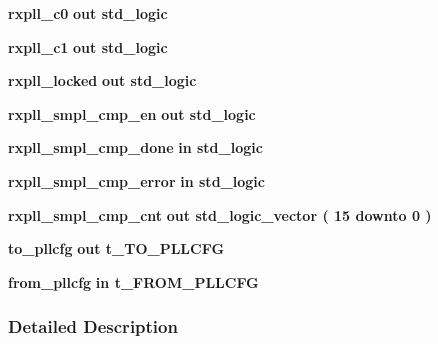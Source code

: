 \begin{DoxyCompactItemize}
\item 
{\bf rxpll\+\_\+c0}  {\bfseries {\bfseries \textcolor{keywordflow}{out}\textcolor{vhdlchar}{ }}} {\bfseries \textcolor{comment}{std\+\_\+logic}\textcolor{vhdlchar}{ }} 
\item 
{\bf rxpll\+\_\+c1}  {\bfseries {\bfseries \textcolor{keywordflow}{out}\textcolor{vhdlchar}{ }}} {\bfseries \textcolor{comment}{std\+\_\+logic}\textcolor{vhdlchar}{ }} 
\item 
{\bf rxpll\+\_\+locked}  {\bfseries {\bfseries \textcolor{keywordflow}{out}\textcolor{vhdlchar}{ }}} {\bfseries \textcolor{comment}{std\+\_\+logic}\textcolor{vhdlchar}{ }} 
\item 
{\bf rxpll\+\_\+smpl\+\_\+cmp\+\_\+en}  {\bfseries {\bfseries \textcolor{keywordflow}{out}\textcolor{vhdlchar}{ }}} {\bfseries \textcolor{comment}{std\+\_\+logic}\textcolor{vhdlchar}{ }} 
\item 
{\bf rxpll\+\_\+smpl\+\_\+cmp\+\_\+done}  {\bfseries {\bfseries \textcolor{keywordflow}{in}\textcolor{vhdlchar}{ }}} {\bfseries \textcolor{comment}{std\+\_\+logic}\textcolor{vhdlchar}{ }} 
\item 
{\bf rxpll\+\_\+smpl\+\_\+cmp\+\_\+error}  {\bfseries {\bfseries \textcolor{keywordflow}{in}\textcolor{vhdlchar}{ }}} {\bfseries \textcolor{comment}{std\+\_\+logic}\textcolor{vhdlchar}{ }} 
\item 
{\bf rxpll\+\_\+smpl\+\_\+cmp\+\_\+cnt}  {\bfseries {\bfseries \textcolor{keywordflow}{out}\textcolor{vhdlchar}{ }}} {\bfseries \textcolor{comment}{std\+\_\+logic\+\_\+vector}\textcolor{vhdlchar}{ }\textcolor{vhdlchar}{(}\textcolor{vhdlchar}{ }\textcolor{vhdlchar}{ } \textcolor{vhdldigit}{15} \textcolor{vhdlchar}{ }\textcolor{keywordflow}{downto}\textcolor{vhdlchar}{ }\textcolor{vhdlchar}{ } \textcolor{vhdldigit}{0} \textcolor{vhdlchar}{ }\textcolor{vhdlchar}{)}\textcolor{vhdlchar}{ }} 
\item 
{\bf to\+\_\+pllcfg}  {\bfseries {\bfseries \textcolor{keywordflow}{out}\textcolor{vhdlchar}{ }}} {\bfseries {\bfseries {\bf t\+\_\+\+T\+O\+\_\+\+P\+L\+L\+C\+FG}} \textcolor{vhdlchar}{ }} 
\item 
{\bf from\+\_\+pllcfg}  {\bfseries {\bfseries \textcolor{keywordflow}{in}\textcolor{vhdlchar}{ }}} {\bfseries {\bfseries {\bf t\+\_\+\+F\+R\+O\+M\+\_\+\+P\+L\+L\+C\+FG}} \textcolor{vhdlchar}{ }} 
\end{DoxyCompactItemize}


\subsubsection{Detailed Description}


